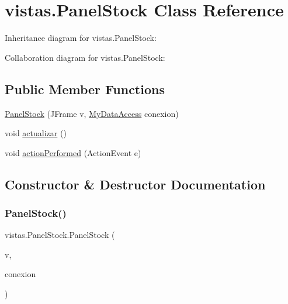 \hypertarget{classvistas_1_1_panel_stock}{}\section{vistas.\+Panel\+Stock Class Reference}
\label{classvistas_1_1_panel_stock}


Inheritance diagram for vistas.\+Panel\+Stock\+:


Collaboration diagram for vistas.\+Panel\+Stock\+:
\subsection*{Public Member Functions}
\begin{DoxyCompactItemize}
\item 
\mbox{\hyperlink{classvistas_1_1_panel_stock_ac2656229352b5e5f052656946d81bf0d}{Panel\+Stock}} (J\+Frame v, \mbox{\hyperlink{classconexion_s_q_l_1_1_my_data_access}{My\+Data\+Access}} conexion)
\item 
void \mbox{\hyperlink{classvistas_1_1_panel_stock_a10b718e705ff2bf3264a018f07a2eab6}{actualizar}} ()
\item 
void \mbox{\hyperlink{classvistas_1_1_panel_stock_a43487e4ae1276f0a5a855790bcd5c900}{action\+Performed}} (Action\+Event e)
\end{DoxyCompactItemize}


\subsection{Constructor \& Destructor Documentation}
\mbox{\label{classvistas_1_1_panel_stock_ac2656229352b5e5f052656946d81bf0d}} 
\subsubsection{\texorpdfstring{Panel\+Stock()}{PanelStock()}}
{\footnotesize\ttfamily vistas.\+Panel\+Stock.\+Panel\+Stock (\begin{DoxyParamCaption}\item[{J\+Frame}]{v,  }\item[{\mbox{\hyperlink{classconexion_s_q_l_1_1_my_data_access}{My\+Data\+Access}}}]{conexion }\end{DoxyParamCaption})\hspace{0.3cm}{\ttfamily [inline]}}

